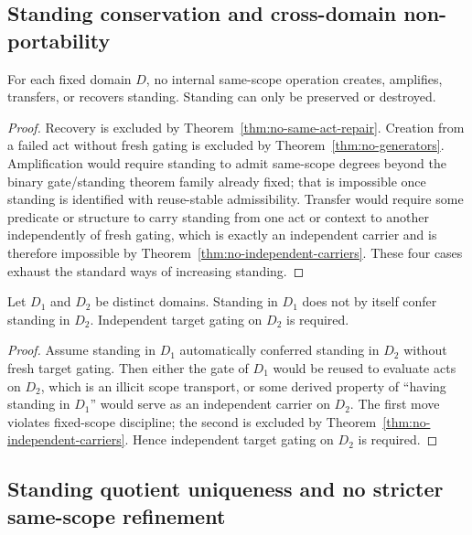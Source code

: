 \subsection{Standing conservation and cross-domain non-portability}

\begin{theorem}
\label{thm:standing-conservation}
For each fixed domain $D$, no internal same-scope operation creates, amplifies, transfers, or recovers standing. Standing can only be preserved or destroyed.
\end{theorem}

\begin{proof}
Recovery is excluded by Theorem~\ref{thm:no-same-act-repair}. Creation from a failed act without fresh gating is excluded by Theorem~\ref{thm:no-generators}. Amplification would require standing to admit same-scope degrees beyond the binary gate/standing theorem family already fixed; that is impossible once standing is identified with reuse-stable admissibility. Transfer would require some predicate or structure to carry standing from one act or context to another independently of fresh gating, which is exactly an independent carrier and is therefore impossible by Theorem~\ref{thm:no-independent-carriers}. These four cases exhaust the standard ways of increasing standing.\cite{MaleyNecessity,MaleyUnus}
\end{proof}

\begin{corollary}
Let $D_1$ and $D_2$ be distinct domains. Standing in $D_1$ does not by itself confer standing in $D_2$. Independent target gating on $D_2$ is required.
\end{corollary}

\begin{proof}
Assume standing in $D_1$ automatically conferred standing in $D_2$ without fresh target gating. Then either the gate of $D_1$ would be reused to evaluate acts on $D_2$, which is an illicit scope transport, or some derived property of ``having standing in $D_1$'' would serve as an independent carrier on $D_2$. The first move violates fixed-scope discipline; the second is excluded by Theorem~\ref{thm:no-independent-carriers}. Hence independent target gating on $D_2$ is required.\cite{MaleyNecessity,MaleyUnus}
\end{proof}

\subsection{Standing quotient uniqueness and no stricter same-scope refinement}


